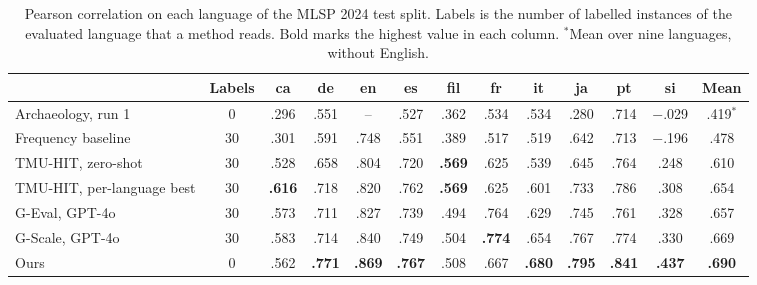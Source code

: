 \begin{table}[t]
\centering
\small
\setlength{\tabcolsep}{4.5pt}
\begin{tabular}{lcccccccccccc}
\toprule
 & Labels & ca & de & en & es & fil & fr & it & ja & pt & si & Mean \\
\midrule
Archaeology, run 1         & 0      & .296 & .551 & --   & .527 & .362 & .534 & .534 & .280 & .714 & $-$.029 & .419$^{*}$ \\ %
\midrule
Frequency baseline         & 30     & .301 & .591 & .748 & .551 & .389 & .517 & .519 & .642 & .713 & $-$.196 & .478 \\
TMU-HIT, zero-shot         & 30     & .528 & .658 & .804 & .720 & \textbf{.569} & .625 & .539 & .645 & .764 & .248 & .610 \\
TMU-HIT, per-language best & 30     & \textbf{.616} & .718 & .820 & .762 & \textbf{.569} & .625 & .601 & .733 & .786 & .308 & .654 \\
G-Eval, GPT-4o             & 30     & .573 & .711 & .827 & .739 & .494 & .764 & .629 & .745 & .761 & .328 & .657 \\
G-Scale, GPT-4o            & 30     & .583 & .714 & .840 & .749 & .504 & \textbf{.774} & .654 & .767 & .774 & .330 & .669 \\
\midrule
Ours                       & 0      & .562 & \textbf{.771} & \textbf{.869} & \textbf{.767} & .508 & .667 & \textbf{.680} & \textbf{.795} & \textbf{.841} & \textbf{.437} & \textbf{.690} \\ %
\bottomrule
\end{tabular}
\caption{Pearson correlation on each language of the MLSP 2024 test split. Labels is the number of
labelled instances of the evaluated language that a method reads. Bold marks the highest value in
each column. $^{*}$Mean over nine languages, without English.}
\label{tab:published}
\end{table}

